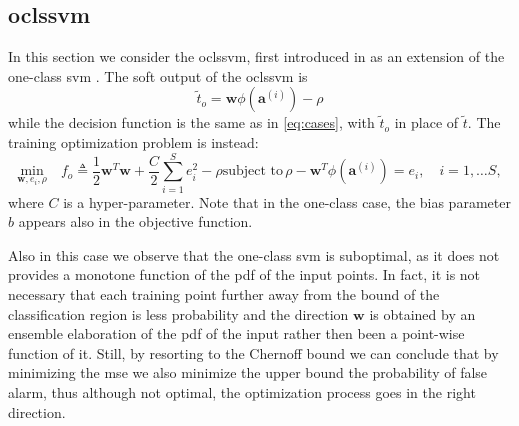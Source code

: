 \documentclass[draftcls,onecolumn,12pt]{IEEEtran}
\begin{document}
\subsection{\Acl{oclssvm}}
In this section we consider the \ac{oclssvm}, first introduced in \cite{choi2009least} as an extension of the one-class \ac{svm} \cite{Scholkopf2001estimating}. The soft output of the \ac{oclssvm} is 
\begin{equation}
	\tilde{t}_o = \bm{w} \phi(\bm{a}^{(i)}) - \rho		
\end{equation} 
while the decision function is the same as in \eqref{eq:cases}, with $\tilde{t}_o$ in place of $\tilde{t}$. The training optimization problem is instead:
\begin{subequations}
	\label{eq:oneClassSvm}
	\begin{equation}
	\label{eq:oneClass1}
	\underset{\bm{w},e_i, \rho}{\text{min}} \quad f_o \triangleq
	 \frac{1}{2} \bm{w}^T \bm{w} +  \frac{C}{2} \sum_{i=1}^S e_i^2 - \rho 
	\end{equation}
	\begin{equation}
	\label{eq:oneClassConstr}
	\text{subject to}\, \rho - \bm{w}^T \phi (\bm{a}^{(i)})  = e_i,  \quad i = 1,\dots S, 
	\end{equation}
\end{subequations}
where $C$ is a hyper-parameter.
Note that in the one-class case, the bias parameter $b$ appears also in the objective function.


Also in this case we observe that the one-class \ac{svm} is suboptimal, as it does not provides a monotone function of the \ac{pdf} of the input points. In fact, it is not necessary that each training point further away from the bound of the classification region is less probability and the direction $\bm{w}$ is obtained by an ensemble elaboration of the \ac{pdf} of the input rather then been a point-wise function of it. Still, by resorting to the Chernoff bound we can conclude that by minimizing the \ac{mse} we also minimize the upper bound the probability of false alarm, thus although not optimal, the optimization process goes in the right direction.
\end{document}
